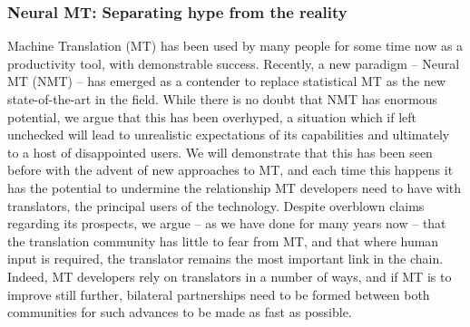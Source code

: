 \subsubsection{Neural MT: Separating hype from the reality}

Machine Translation (MT) has been used by many people for some time now as a productivity tool, with demonstrable success. 
Recently, a new paradigm -- Neural MT (NMT) -- has emerged as a contender to replace statistical MT as the new state-of-the-art in the field. 
While there is no doubt that NMT has enormous potential, we argue that this has been overhyped, a situation which if left unchecked will lead to unrealistic expectations of its capabilities and ultimately to a host of disappointed users. 
We will demonstrate that this has been seen before with the advent of new approaches to MT, and each time this happens it has the potential to undermine the relationship MT developers need to have with translators, the principal users of the technology. 
Despite overblown claims regarding its prospects, we argue -- as we have done for many years now -- that the translation community has little to fear from MT, and that where human input is required, the translator remains the most important link in the chain. 
Indeed, MT developers rely on translators in a number of ways, and if MT is to improve still further, bilateral partnerships need to be formed between both communities for such advances to be made as fast as possible.
